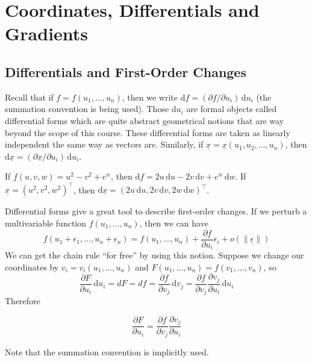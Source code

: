 \section{Coordinates, Differentials and Gradients}
\subsection{Differentials and First-Order Changes}
Recall that if $f=f(u_1,\ldots,u_n)$, then we write $\mathrm df=(\partial f/\partial u_i)\,\mathrm du_i$ (the summation convention is being used).
Those $\mathrm du_i$ are formal objects called differential forms which are quite abstract geometrical notions that are way beyond the scope of this course.
These differential forms are taken as linearly independent the same way as vectors are.
Similarly, if $\underline{x}=\underline{x}(u_1,u_2,\ldots,u_n)$, then $\mathrm d\underline{x}=(\partial \underline{x}/\partial u_i)\,\mathrm du_i$.
\begin{example}
    If $f(u,v,w)=u^2-v^2+e^w$, then $\mathrm df=2u\,\mathrm du-2v\,\mathrm dv+e^w\,\mathrm dw$.
    If $\underline{x}=(u^2,v^2,w^2)^\top$, then $\mathrm d\underline{x}=(2u\,\mathrm du,2v\,\mathrm dv,2w\,\mathrm dw)^\top$.
\end{example}
Differential forms give a great tool to describe first-order changes.
If we perturb a multivariable function $f(u_1,\ldots,u_n)$, then we can have
$$f(u_1+\epsilon_1,\ldots,u_n+\epsilon_n)=f(u_1,\ldots,u_n)+\frac{\partial f}{\partial u_i}\epsilon_i+o(\|\underline{\epsilon}\|)$$
We can get the chain rule ``for free'' by using this notion.
Suppose we change our coordinates by $v_i=v_i(u_1,\ldots,u_n)$ and $F(u_1,\ldots,u_n)=f(v_1,\ldots,v_n)$, so
$$\frac{\partial F}{\partial u_i}\,\mathrm du_i=dF=df=\frac{\partial f}{\partial v_j}\,\mathrm dv_j=\frac{\partial f}{\partial v_j}\frac{\partial v_j}{\partial u_i}\,\mathrm du_i$$
Therefore
\begin{theorem}
    $$\frac{\partial F}{\partial u_i}=\frac{\partial f}{\partial v_j}\frac{\partial v_j}{\partial u_i}$$
\end{theorem}
Note that the summation convention is implicitly used.
